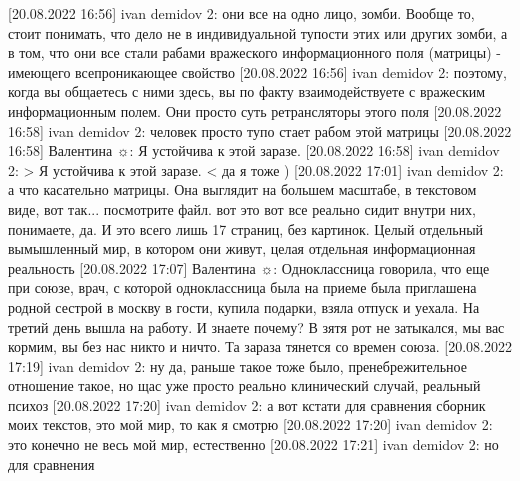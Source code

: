  
 
 
 
 


[20.08.2022 16:56] ivan demidov 2: они все на одно лицо, зомби. Вообще то, стоит понимать, что дело не в индивидуальной тупости этих или других зомби, а в том, что они все стали рабами вражеского информационного поля (матрицы) - имеющего всепроникающее свойство
[20.08.2022 16:56] ivan demidov 2: поэтому, когда вы общаетесь с ними здесь, вы по факту взаимодействуете с вражеским информационным полем. Они просто суть ретрансляторы этого поля
[20.08.2022 16:58] ivan demidov 2: человек просто тупо стает рабом этой матрицы
[20.08.2022 16:58] Валентина ☼: Я устойчива к этой заразе.
[20.08.2022 16:58] ivan demidov 2: 
> Я устойчива к этой заразе. <
да я тоже )
[20.08.2022 17:01] ivan demidov 2: а что касательно матрицы. Она выглядит на большем масштабе, в текстовом виде, вот так... посмотрите файл. вот это вот все реально сидит внутри них, понимаете, да. И это всего лишь 17 страниц, без картинок. Целый отдельный вымышленный мир, в котором они живут, целая отдельная информационная реальность
[20.08.2022 17:07] Валентина ☼: Одноклассница говорила, что еще при союзе, врач, с которой одноклассница была на приеме была приглашена родной сестрой в москву в гости, купила подарки, взяла отпуск и уехала. На третий день вышла на работу.   И знаете почему? В зятя рот не затыкался, мы вас кормим, вы без нас никто и ничто. Та зараза тянется со времен союза.
[20.08.2022 17:19] ivan demidov 2: ну да, раньше такое тоже было, пренебрежительное отношение такое, но щас уже просто реально клинический случай, реальный психоз
[20.08.2022 17:20] ivan demidov 2: а вот кстати для сравнения сборник моих текстов, это мой мир, то как я смотрю
[20.08.2022 17:20] ivan demidov 2: это конечно не весь мой мир, естественно
[20.08.2022 17:21] ivan demidov 2: но для сравнения

